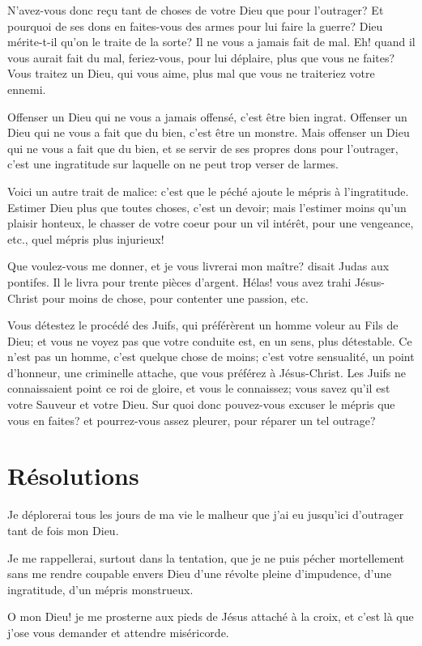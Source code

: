 \documentclass[instructions.tex]{subfiles}
\begin{document}
N'avez-vous donc reçu tant de choses de votre Dieu que pour l'outrager? Et pourquoi de ses dons en faites-vous des armes pour lui faire la guerre? Dieu mérite-t-il qu'on le traite de la sorte? Il ne vous a jamais fait de mal. Eh! quand il vous aurait fait du mal, feriez-vous, pour lui déplaire, plus que vous ne faites? Vous traitez un Dieu, qui vous aime, plus mal que vous ne traiteriez votre ennemi.

Offenser un Dieu qui ne vous a jamais offensé, c'est être bien ingrat. Offenser un Dieu qui ne vous a fait que du bien, c'est être un monstre. Mais offenser un Dieu qui ne vous a fait que du bien, et se servir de ses propres dons pour l'outrager, c'est une ingratitude sur laquelle on ne peut trop verser de larmes.

\quarto Voici un autre trait de malice: c'est que le péché ajoute le mépris à l'ingratitude. Estimer Dieu plus que toutes choses, c'est un devoir; mais l'estimer moins qu'un plaisir honteux, le chasser de votre coeur pour un vil intérêt, pour une vengeance, etc., quel mépris plus injurieux!

Que voulez-vous me donner, et je vous livrerai mon maître? disait Judas aux pontifes. Il le livra pour trente pièces d'argent. Hélas! vous avez trahi Jésus-Christ pour moins de chose, pour contenter une passion, etc.

Vous détestez le procédé des Juifs, qui préférèrent un homme voleur au Fils de Dieu; et vous ne voyez pas que votre conduite est, en un sens, plus détestable. Ce n'est pas un homme, c'est quelque chose de moins; c'est votre sensualité, un point d'honneur, une criminelle attache, que vous préférez à Jésus-Christ. Les Juifs ne connaissaient point ce roi de gloire, et vous le connaissez; vous savez qu'il est votre Sauveur et votre Dieu. Sur quoi donc pouvez-vous excuser le mépris que vous en faites? et pourrez-vous assez pleurer, pour réparer un tel outrage?


\section{Résolutions}

Je déplorerai tous les jours de ma vie le malheur que j'ai eu jusqu'ici d'outrager tant de fois mon Dieu.

\primo Je me rappellerai, surtout dans la tentation, que je ne puis pécher mortellement sans me rendre coupable envers Dieu d'une révolte pleine d'impudence, d'une ingratitude, d'un mépris monstrueux.

\secundo O mon Dieu! je me prosterne aux pieds de Jésus attaché à la croix, et c'est là que j'ose vous demander et attendre miséricorde.
\end{document}
